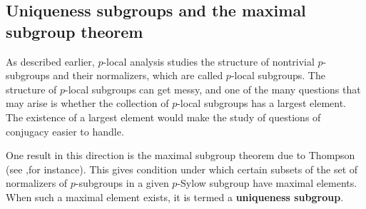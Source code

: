 \documentclass{amsart}
\renewcommand{\definedind}[1]{{\bf #1}}
\begin{document}
\subsection{Uniqueness subgroups and the maximal subgroup theorem}

As described earlier, $p$-local analysis studies the structure of
nontrivial $p$-subgroups and their normalizers, which are called
$p$-local subgroups. The structure of $p$-local subgroups can get
messy, and one of the many questions that may arise is whether the
collection of $p$-local subgroups has a largest element. The existence
of a largest element would make the study of questions of conjugacy
easier to handle.

One result in this direction is the maximal subgroup theorem due to
Thompson (see \cite[Theorem 8.6.3, Page 295--298]{gorenstein},for
instance). This gives condition under which certain subsets of the set
of normalizers of $p$-subgroups in a given $p$-Sylow subgroup have
maximal elements. When such a maximal element exists, it is termed a
\definedind{uniqueness subgroup}.
\end{document}
